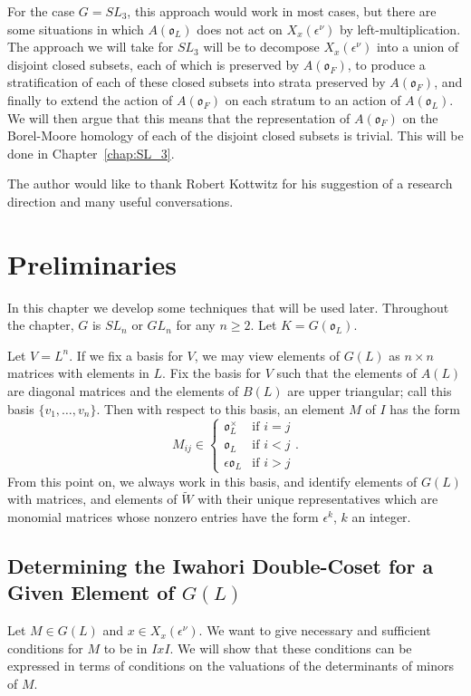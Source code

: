 \documentclass{amsart}
\theoremstyle{definition}
\def\O{\mathfrak{o}}
\def\e{\epsilon}
\def\W{\widetilde{W}}
\def\A{A(\O_F)}
\def\en{\e^{\nu}}
\def\X{X_x(\en)}
\begin{document}
  For the case $G = SL_3$, this approach would work in most cases, but there
  are some situations in which $A(\O_L)$ does not act on $\X$ by
  left-multiplication.  The approach we will take for $SL_3$ will be to
  decompose $\X$ into a union of disjoint closed subsets, each of which is
  preserved by $\A$, to produce a stratification of each of these closed
  subsets into strata preserved by $\A$, and finally to extend the action of
  $\A$ on each stratum to an action of $A(\O_L)$.  We will then argue that this
  means that the representation of $\A$ on the Borel-Moore homology of each of
  the disjoint closed subsets is trivial.  This will be done in
  Chapter~\ref{chap:SL_3}.

  The author would like to thank Robert Kottwitz for his suggestion of a
  research direction and many useful conversations.

  \section{Preliminaries}
  In this chapter we develop some techniques that will be used later.
  Throughout the chapter, $G$ is $SL_n$ or $GL_n$ for any $n \ge 2$.  Let $K =
  G(\O_L)$.

  Let $V = L^n$.  If we fix a basis for $V$, we may view elements of $G(L)$ as
  $n\times n$ matrices with elements in $L$.  Fix the basis for $V$ such that
  the elements of $A(L)$ are diagonal matrices and the elements of $B(L)$ are
  upper triangular; call this basis $\{ v_1, \ldots, v_n \}$.  Then with
  respect to this basis, an element $M$ of $I$ has the form
  \begin{equation}
    \label{eq:Iwahori_form}
    M_{ij} \in 
    \begin{cases} 
      \O_L^\times & \text{if $i=j$} \\ 
      \O_L & \text{if $i < j$} \\
      \e\O_L & \text{if $i > j$}
    \end{cases}.
  \end{equation}
  From this point on, we always work in this basis, and identify elements of
  $G(L)$ with matrices, and elements of $\W$ with their unique representatives
  which are monomial matrices whose nonzero entries have the form $\e^k$, $k$
  an integer.
  
  \subsection{Determining the Iwahori Double-Coset for a Given Element of $G(L)$}
  \label{sec:DeterminingIwahoriDoubleCosetForElement}
  Let $M \in G(L)$ and $x \in \X$.  We want to give necessary and sufficient
  conditions for $M$ to be in $IxI$.  We will show that these conditions can be
  expressed in terms of conditions on the valuations of the determinants of
  minors of $M$.
  
\end{document}
